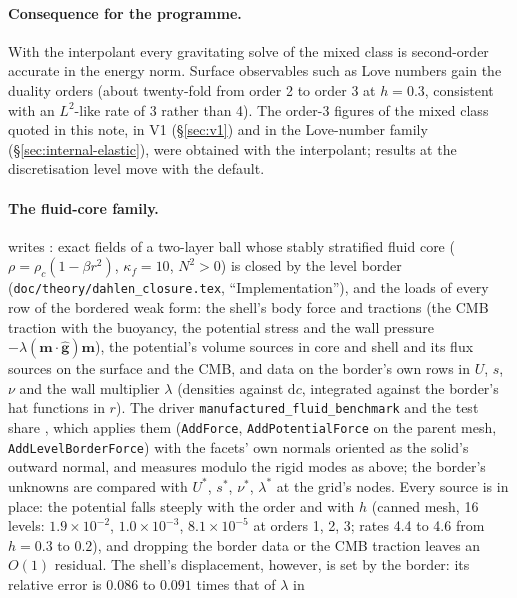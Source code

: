\documentclass[11pt]{article}
\numberwithin{equation}{section}
\newcommand{\code}[1]{\texttt{#1}}
\begin{document}
\paragraph{Consequence for the programme.} With the interpolant every
gravitating solve of the mixed class is second-order accurate in the energy
norm. Surface observables such as Love numbers gain the duality orders
(about twenty-fold from order 2 to order 3 at $h=0.3$, consistent with an
$L^2$-like rate of 3 rather than 4). The order-3 figures of the mixed class
quoted in this note, in V1 (\S\ref{sec:v1}) and in the Love-number family
(\S\ref{sec:internal-elastic}), were obtained with the interpolant; results
at the discretisation level move with the default.

\paragraph{The fluid-core family.}  writes
: exact fields of a two-layer ball whose stably
stratified fluid core ($\rho=\rho_c(1-\beta r^2)$, $\kappa_f=10$, $N^2>0$)
is closed by the level border (\code{doc/theory/dahlen\_closure.tex},
``Implementation''), and the loads of every row of the bordered weak form:
the shell's body force and tractions (the CMB traction with the buoyancy,
the potential stress and the wall pressure $-\lambda(\mathbf{m}\cdot\hat{\mathbf
g})\mathbf{m}$), the potential's volume sources in core and shell and its
flux sources on the surface and the CMB, and data on the border's own rows
in $U$, $s$, $\nu$ and the wall multiplier $\lambda$ (densities against
$\mathrm{d}c$, integrated against the border's hat functions in $r$). The
driver \code{manufactured\_fluid\_benchmark} and the test
 share , which
applies them (\code{AddForce}, \code{AddPotentialForce} on the parent mesh,
\code{AddLevelBorderForce}) with the facets' own normals oriented as the
solid's outward normal, and measures modulo the rigid modes as above; the
border's unknowns are compared with $U^*$, $s^*$, $\nu^*$, $\lambda^*$ at
the grid's nodes. Every source is in place: the potential falls steeply
with the order and with $h$ (canned mesh, 16 levels: $1.9\times10^{-2}$,
$1.0\times10^{-3}$, $8.1\times10^{-5}$ at orders 1, 2, 3; rates 4.4 to 4.6
from $h=0.3$ to $0.2$), and dropping the border data or the CMB traction
leaves an $O(1)$ residual. The shell's displacement, however, is set by the
border: its relative error is $0.086$ to $0.091$ times that of $\lambda$ in
\end{document}
